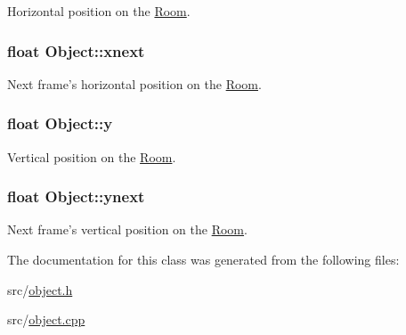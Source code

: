 Horizontal position on the \hyperlink{class_room}{Room}. 

\hypertarget{class_object_adf988f967e46c4fd5d3276778d83b51c}{
\subsubsection[{xnext}]{\setlength{\rightskip}{0pt plus 5cm}float Object\-::xnext\hspace{0.3cm}{\ttfamily [protected]}}}\label{class_object_adf988f967e46c4fd5d3276778d83b51c}


Next frame's horizontal position on the \hyperlink{class_room}{Room}. 

\hypertarget{class_object_a2870044ec214e97550ee28db89c6382a}{
\subsubsection[{y}]{\setlength{\rightskip}{0pt plus 5cm}float Object\-::y}}\label{class_object_a2870044ec214e97550ee28db89c6382a}


Vertical position on the \hyperlink{class_room}{Room}. 

\hypertarget{class_object_a23acb9460963396dc0bda8d9dc0c6771}{
\subsubsection[{ynext}]{\setlength{\rightskip}{0pt plus 5cm}float Object\-::ynext\hspace{0.3cm}{\ttfamily [protected]}}}\label{class_object_a23acb9460963396dc0bda8d9dc0c6771}


Next frame's vertical position on the \hyperlink{class_room}{Room}. 



The documentation for this class was generated from the following files\-:\begin{DoxyCompactItemize}
\item 
src/\hyperlink{object_8h}{object.\-h}\item 
src/\hyperlink{object_8cpp}{object.\-cpp}\end{DoxyCompactItemize}
